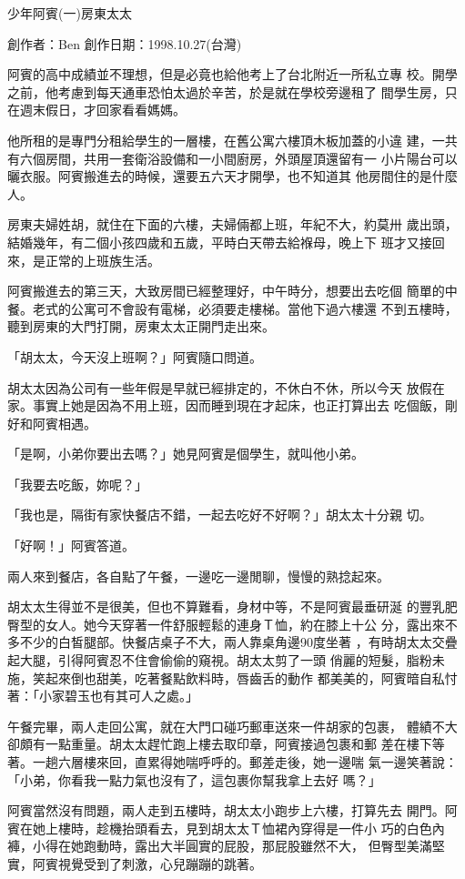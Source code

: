 



少年阿賓(一)房東太太

創作者：Ben
創作日期：1998.10.27(台灣)


阿賓的高中成績並不理想，但是必竟也給他考上了台北附近一所私立專
校。開學之前，他考慮到每天通車恐怕太過於辛苦，於是就在學校旁邊租了
間學生房，只在週末假日，才回家看看媽媽。

他所租的是專門分租給學生的一層樓，在舊公寓六樓頂木板加蓋的小違
建，一共有六個房間，共用一套衛浴設備和一小間廚房，外頭屋頂還留有一
小片陽台可以曬衣服。阿賓搬進去的時候，還要五六天才開學，也不知道其
他房間住的是什麼人。

房東夫婦姓胡，就住在下面的六樓，夫婦倆都上班，年紀不大，約莫卅
歲出頭，結婚幾年，有二個小孩四歲和五歲，平時白天帶去給褓母，晚上下
班才又接回來，是正常的上班族生活。

阿賓搬進去的第三天，大致房間已經整理好，中午時分，想要出去吃個
簡單的中餐。老式的公寓可不會設有電梯，必須要走樓梯。當他下過六樓還
不到五樓時，聽到房東的大門打開，房東太太正開門走出來。

「胡太太，今天沒上班啊？」阿賓隨口問道。

胡太太因為公司有一些年假是早就已經排定的，不休白不休，所以今天
放假在家。事實上她是因為不用上班，因而睡到現在才起床，也正打算出去
吃個飯，剛好和阿賓相遇。

「是啊，小弟你要出去嗎？」她見阿賓是個學生，就叫他小弟。

「我要去吃飯，妳呢？」

「我也是，隔街有家快餐店不錯，一起去吃好不好啊？」胡太太十分親
切。

「好啊！」阿賓答道。

兩人來到餐店，各自點了午餐，一邊吃一邊閒聊，慢慢的熟捻起來。

胡太太生得並不是很美，但也不算難看，身材中等，不是阿賓最垂研涎
的豐乳肥臀型的女人。她今天穿著一件舒服輕鬆的連身Ｔ恤，約在膝上十公
分，露出來不多不少的白皙腿部。快餐店桌子不大，兩人靠桌角邊90度坐著
，有時胡太太交疊起大腿，引得阿賓忍不住會偷偷的窺視。胡太太剪了一頭
俏麗的短髮，脂粉未施，笑起來倒也甜美，吃著餐點飲料時，唇齒舌的動作
都美美的，阿賓暗自私忖著：「小家碧玉也有其可人之處。」

午餐完畢，兩人走回公寓，就在大門口碰巧郵車送來一件胡家的包裹，
體績不大卻頗有一點重量。胡太太趕忙跑上樓去取印章，阿賓接過包裹和郵
差在樓下等著。一趟六層樓來回，直累得她喘呼呼的。郵差走後，她一邊喘
氣一邊笑著說：「小弟，你看我一點力氣也沒有了，這包裹你幫我拿上去好
嗎？」

阿賓當然沒有問題，兩人走到五樓時，胡太太小跑步上六樓，打算先去
開門。阿賓在她上樓時，趁機抬頭看去，見到胡太太Ｔ恤裙內穿得是一件小
巧的白色內褲，小得在她跑動時，露出大半圓實的屁股，那屁股雖然不大，
但臀型美滿堅實，阿賓視覺受到了刺激，心兒蹦蹦的跳著。

